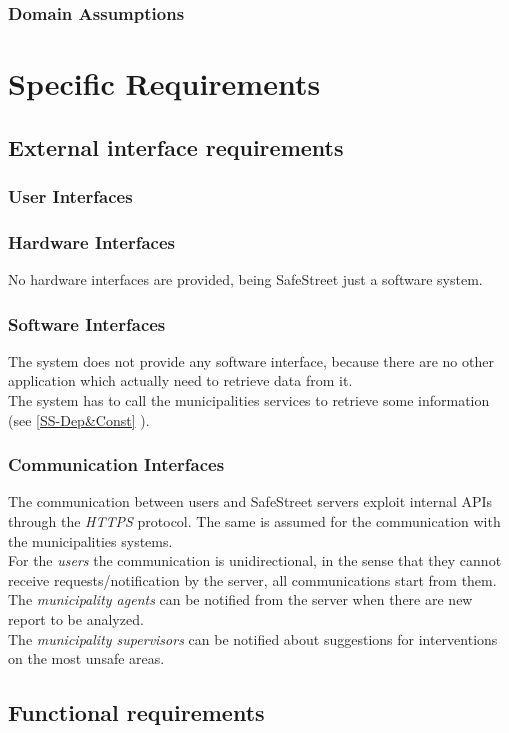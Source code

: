 \documentclass[a4paper]{report}
\begin{document}
\subsection{Domain Assumptions}
\lipsum[1]

\chapter{Specific Requirements}
\lipsum[1]
\section{External interface requirements}
\subsection{User Interfaces}
\lipsum[1]
\subsection{Hardware Interfaces}
No hardware interfaces are provided, being SafeStreet just a software system.
\subsection{Software Interfaces}
The system does not provide any software interface, because there are no other application which actually need to retrieve data from it. \\
The system has to call the municipalities services to retrieve some information (see \ref{SS-Dep&Const} ).
\subsection{Communication Interfaces}
The communication between users and SafeStreet servers exploit internal APIs through the \textit{HTTPS} protocol. The same is assumed for the communication with the municipalities systems. \\
For the \textit{users} the communication is unidirectional, in the sense that they cannot receive requests/notification by the server, all communications start from them. \\
The \textit{municipality agents} can be notified from the server when there are new report to be analyzed. \\
The \textit{municipality supervisors} can be notified about suggestions for interventions on the most unsafe areas.
\section{Functional requirements}
\lipsum[1]
\end{document}
